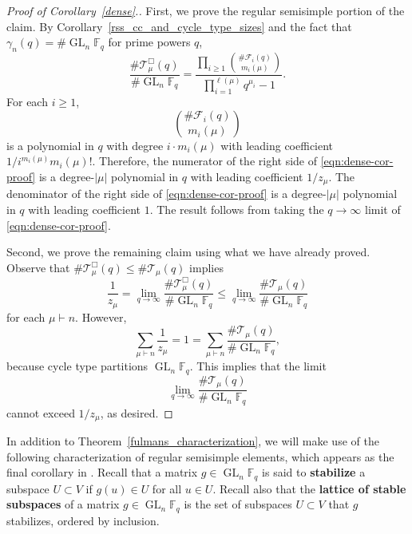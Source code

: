 \documentclass[Unicode,ALCO]{cedram}
\DeclareMathOperator{\GL}{GL}
\newcommand{\F}{\mathbb{F}}
\newcommand{\CF}{\mathcal{F}}
\newcommand{\CT}{\mathcal{T}}
\newcommand{\myemph}{\textbf}
\begin{document}
\begin{proof}[Proof of Corollary~\ref{dense}.]
First, we prove the regular semisimple portion of the claim.
By Corollary~\ref{rss_cc_and_cycle_type_sizes} and the fact that \(\gamma_n (q) = \# \GL_n \F_q\) for prime powers \(q\),
\begin{equation}
\label{eqn:dense-cor-proof}
\frac{\#\CT_\mu^\Box (q)}{\# \GL_n \F_q} = \frac{\prod_{i \geq 1} \binom{\# \CF_i (q)}{m_i(\mu)}}{\prod_{i=1}^{\ell(\mu)} q^{\mu_i}-1}.
\end{equation}
For each \(i \geq 1\),
\begin{equation}
\binom{\# \CF_i (q)}{m_i (\mu)}
\end{equation}
is a polynomial in \(q\) with degree \(i \cdot m_i (\mu)\) with leading coefficient \(1 / i^{m_i(\mu)} m_i(\mu)!\).
Therefore, the numerator of the right side of \eqref{eqn:dense-cor-proof} is a degree-\(|\mu|\) polynomial in \(q\) with leading coefficient \(1 / z_\mu\).
The denominator of the right side of \eqref{eqn:dense-cor-proof} is a degree-\(|\mu|\) polynomial in \(q\) with leading coefficient \(1\).
The result follows from taking the \(q \to \infty\) limit of \eqref{eqn:dense-cor-proof}.

Second, we prove the remaining claim using what we have already proved.
Observe that \(\# \CT_\mu^\Box (q) \leq \# \CT_\mu (q)\) implies
\begin{equation}
\frac{1}{z_\mu}
=
\lim_{q \to \infty}
\frac{\# \CT_\mu^\Box (q)}{\# \GL_n \F_q}
\leq
\lim_{q \to \infty} \frac{\# \CT_\mu (q)}{\# \GL_n \F_q}
\end{equation}
for each \(\mu \vdash n\).
However,
\begin{equation}
	\sum_{\mu \vdash n}
	\frac{1}{z_\mu}
	=
	1
	=
	\sum_{\mu \vdash n}
	\frac{\# \CT_\mu (q)}{\# \GL_n \F_q},
\end{equation}
because cycle type partitions \(\GL_n \F_q\).
This implies that the limit
\begin{equation}
	\lim_{q \to \infty} \frac{\# \CT_\mu (q)}{\# \GL_n \F_q}
\end{equation}
cannot exceed \(1 / z_\mu\), as desired.
\end{proof}




In addition to Theorem~\ref{fulmans_characterization}, we will make use of the following characterization of regular semisimple elements, which appears as the final corollary in \cite[Section~3]{lattice}.
Recall that a matrix \(g \in \GL_n \F_q\) is said to \myemph{stabilize} a subspace \(U \subset V\) if \(g(u) \in U\) for all \(u \in U\).
Recall also that the \myemph{lattice of stable subspaces} of a matrix $g \in \GL_n \F_q$ is the set of subspaces $U \subset V$ that \(g\) stabilizes, ordered by inclusion.
\end{document}
